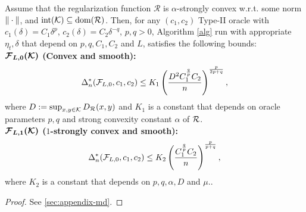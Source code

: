 \begin{theorem}
\label{thm:ub}
Assume that the regularization function $\mathcal{R}$ is $\alpha$-strongly convex w.r.t. some norm $\|\cdot\|$, and $\operatorname{int}(\mathcal{K})\subseteq \operatorname{dom}(\mathcal{R})$.
Then, for any $(c_1,c_2)$ Type-II oracle
 with $c_1(\delta) = C_1 \delta^p$, $c_2(\delta) = C_2 \delta^{-q}$, $p,q>0$,
 Algorithm \cref{alg} run with appropriate $\eta_t, \delta$ that depend on $p, q, C_1, C_2$ and $L$, satisfies the following bounds:\\
%
\textbf{$\bm{\mathcal{F}_{L,0}(\mathcal{K})}$ (Convex and smooth):}
\[
\Delta_n^{*}(\mathcal{F}_{L,0}, c_1,c_2) \le K_1\left(\dfrac{D^2 {C_1^{\frac{q}{p}} C_2}}{ n}\right)^{\frac{p}{2p+q}},
\]
where $D:=\sup_{x,y\in \mathcal{K}} D_{\mathcal{R}}(x,y)$ and $K_1$ is a constant that depends on oracle parameters $p, q$ and strong convexity constant $\alpha$ of $\cal R$.\\
\textbf{$\bm{\mathcal{F}_{L,1}(\mathcal{K})}$ ($1$-strongly convex and smooth):}
\[
\Delta_n^{*}(\mathcal{F}_{L,0}, c_1,c_2) \le K_2\left(\dfrac{C_1^{\frac{q}{p}} C_2}{ n}\right)^{\frac{p}{p+q}},
\]
where $K_2$ is a constant that depends on $p, q, \alpha, D$ and $\mu$..


\end{theorem}
\begin{proof}
See \cref{sec:appendix-md}.
\end{proof}

